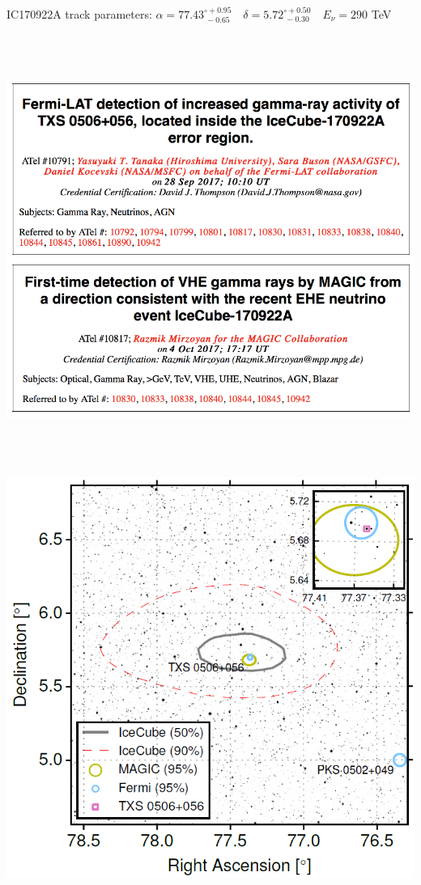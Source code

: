 \Tr
\onecolumn
IC170922A track parameters: $\alpha=77.43^{\circ +0.95}_{~-0.65} \quad \delta=5.72^{\circ +0.50}_{~-0.30} \quad E_{\nu}=290$ TeV
\begin{center}
\includegraphics[keepaspectratio,height=14cm]{IC170922A}
\end{center}

\Tr
{}
\includegraphics[keepaspectratio,width=13.5cm]{IC170922A-area}

